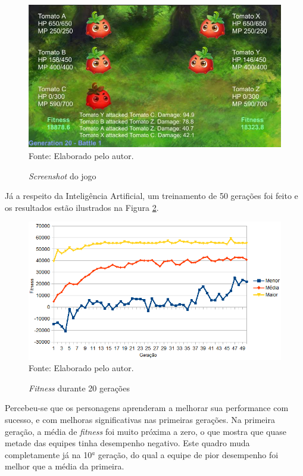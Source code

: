 \documentclass[
	12pt,					%
	openright,				%
	oneside,				%
	a4paper,				%
	bibjustif,				%
	chapter=TITLE,			%
	english,				%
	brazil,					%
	]{abntex2}
\newcommand{\source}[1]{\small Fonte: {#1}}
\begin{document}
	\begin{figure}[ht!]
		\centering
		\caption{\textit{Screenshot} do jogo}
		\includegraphics[scale=0.6]{img/GameScreenshot.jpg}\\
		\vspace{0.5mm}
		\source{Elaborado pelo autor.}
		\label{fig:gameScreenshot}
	\end{figure}

	Já a respeito da Inteligência Artificial,
	um treinamento de 50 gerações foi feito e os resultados estão ilustrados na Figura \ref{fig:fitnessResults}.
	
	\begin{figure}[ht!]
		\centering
		\caption{\textit{Fitness} durante 20 gerações}
		\includegraphics[scale=0.7]{img/AI-Result.png}\\
		\vspace{0.5mm}
		\source{Elaborado pelo autor.}
		\label{fig:fitnessResults}
	\end{figure}
	
	Percebeu-se que os personagens aprenderam a melhorar sua performance com sucesso,
	e com melhoras significativas nas primeiras gerações.
	Na primeira geração, a média de \textit{fitness} foi muito próxima a zero,
	o que mostra que quase metade das equipes tinha desempenho negativo.
	Este quadro muda completamente já na 10$^a$ geração,
	do qual a equipe de pior desempenho foi melhor que a média da primeira.
	
\end{document}
